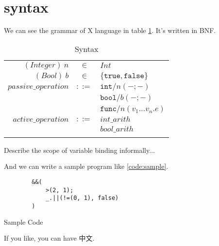 \section{syntax}

We can see the grammar of X language in table \ref{syntax}. It's written in BNF\cite{bnf}.

\begin{longtable}{rcl}
    \hline
    $ (\!\textit{Integer})\ n $ & $ \in $ & $ Int $\\
    $ (\!\textit{Bool})\ b $ & $ \in $ & $ \{\texttt{true}, \texttt{false}\} $\\

    $ passive\_operation $ & $::=$ & $ \texttt{int}/n(-;-) $\\
     && $ \texttt{bool}/b(-;-) $\\
     && $ \texttt{func}/n(v_1\dots v_n.e)$\\ 
     $ active\_operation $ & $::=$ & $int\_arith$\\
     && $ bool\_arith $\\ \hline
     \caption{Syntax}
     \label{syntax}
\end{longtable}

Describe the scope of variable binding informally...

And we can write a sample program like \ref{code:sample}.

\begin{listing}[H]
    \begin{verbatim}
        &&(
            >(2, 1);
            _.||(!=(0, 1), false)
        )
    \end{verbatim}
	\caption{Sample Code}
    \label{code:sample}
\end{listing}

If you like, you can have 中文.